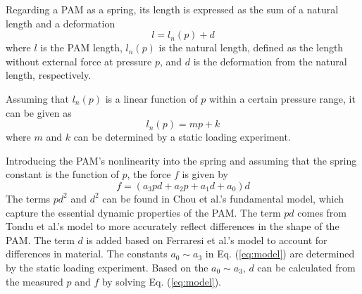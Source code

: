 Regarding a PAM as a spring\cite{spring}, its length is expressed as the sum of a natural length and a deformation 
\begin{equation}
   l = l_n(p) + d
\label{eq:estimation}
\end{equation}
where $l$ is the PAM length, $l_n(p)$ is the natural length, defined as the length without external force at pressure $p$, and $d$ is the deformation from the natural length, respectively.
 
Assuming that $l_n(p)$ is a linear function of $p$ within a certain pressure range, it can be given as 
\begin{equation}
l_n(p) = mp + k
\label{eq:L_n}
\end{equation}
where $m$ and $k$ can be determined by a static loading experiment.
 
Introducing the PAM's nonlinearity into the spring and assuming that the spring constant is the function of $p$\cite{spring}, the force $f$ is given by
\begin{equation}
\label{eq:model}
f = (a_3pd + a_2p + a_1d + a_0)d
\end{equation}
The terms $pd^2$ and $d^2$ can be found in Chou et al.'s fundamental model\cite{chouMeasurementModelingMcKibben1996}, which capture the essential dynamic properties of the PAM. The term $pd$  comes from Tondu et al.'s model\cite{ModelingControl} to more accurately reflect differences in the shape of the PAM. The term $d$ is added based on Ferraresi et al.'s model\cite{Comparison} to account for differences in material. The constants $a_0 \sim a_3$ in Eq. (\ref{eq:model}) are determined by the static loading experiment. Based on the $a_0 \sim a_3$, $d$  can be calculated from the measured $p$ and $f$ by solving Eq. (\ref{eq:model}).




%


